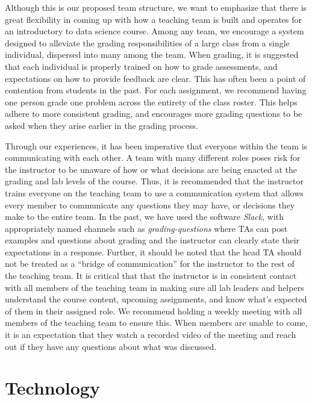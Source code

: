 \documentclass[
  12pt]{article}
\begin{document}
Although this is our proposed team structure, we want to emphasize that
there is great flexibility in coming up with how a teaching team is
built and operates for an introductory to data science course. Among any
team, we encourage a system designed to alleviate the grading
responsibilities of a large class from a single individual, dispersed
into many among the team. When grading, it is suggested that each
individual is properly trained on how to grade assessments, and
expectations on how to provide feedback are clear. This has often been a
point of contention from students in the past. For each assignment, we
recommend having one person grade one problem across the entirety of the
class roster. This helps adhere to more consistent grading, and
encourages more grading questions to be asked when they arise earlier in
the grading process.

Through our experiences, it has been imperative that everyone within the
team is communicating with each other. A team with many different roles
poses risk for the instructor to be unaware of how or what decisions are
being enacted at the grading and lab levels of the course. Thus, it is
recommended that the instructor trains everyone on the teaching team to
use a communication system that allows every member to communicate any
questions they may have, or decisions they make to the entire team. In
the past, we have used the software \emph{Slack}, with appropriately
named channels such as \emph{grading-questions} where TAs can post
examples and questions about grading and the instructor can clearly
state their expectations in a response. Further, it should be noted that
the head TA should not be treated as a ``bridge of communication'' for
the instructor to the rest of the teaching team. It is critical that
that the instructor is in consistent contact with all members of the
teaching team in making sure all lab leaders and helpers understand the
course content, upcoming assignments, and know what's expected of them
in their assigned role. We recommend holding a weekly meeting with all
members of the teaching team to ensure this. When members are unable to
come, it is an expectation that they watch a recorded video of the
meeting and reach out if they have any questions about what was
discussed.

\hypertarget{sec-tech}{%
\section{Technology}\label{sec-tech}}
\end{document}
